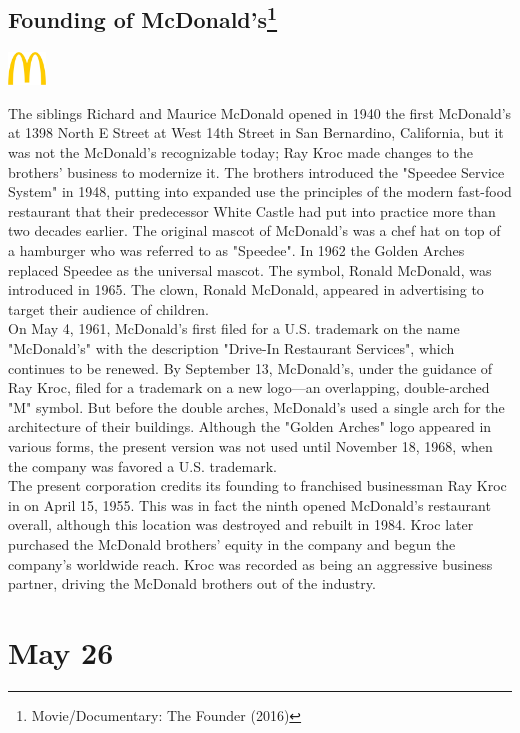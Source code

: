 \documentclass[11pt]{report}
\begin{document}
\subsection{Founding of McDonald's\protect\footnote{Movie/Documentary: The Founder (2016)}}
\vspace{2mm}\begin{center}\includegraphics[width=1cm]{./img/mcdonaldsLogo.jpg}\end{center}
The siblings Richard and Maurice McDonald opened in 1940 the first McDonald's at 1398 North E Street at West 14th Street in San Bernardino, California, but it was not the McDonald's recognizable today; Ray Kroc made changes to the brothers' business to modernize it. The brothers introduced the "Speedee Service System" in 1948, putting into expanded use the principles of the modern fast-food restaurant that their predecessor White Castle had put into practice more than two decades earlier. The original mascot of McDonald's was a chef hat on top of a hamburger who was referred to as "Speedee". In 1962 the Golden Arches replaced Speedee as the universal mascot. The symbol, Ronald McDonald, was introduced in 1965. The clown, Ronald McDonald, appeared in advertising to target their audience of children.\\ \indent On May 4, 1961, McDonald's first filed for a U.S. trademark on the name "McDonald's" with the description "Drive-In Restaurant Services", which continues to be renewed. By September 13, McDonald's, under the guidance of Ray Kroc, filed for a trademark on a new logo—an overlapping, double-arched "M" symbol. But before the double arches, McDonald's used a single arch for the architecture of their buildings. Although the "Golden Arches" logo appeared in various forms, the present version was not used until November 18, 1968, when the company was favored a U.S. trademark.\\
\indent The present corporation credits its founding to franchised businessman Ray Kroc in on April 15, 1955. This was in fact the ninth opened McDonald's restaurant overall, although this location was destroyed and rebuilt in 1984. Kroc later purchased the McDonald brothers' equity in the company and begun the company's worldwide reach. Kroc was recorded as being an aggressive business partner, driving the McDonald brothers out of the industry.
\section{May 26}
\end{document}
